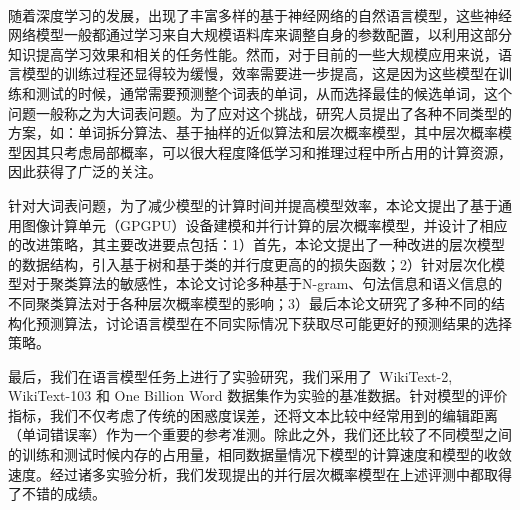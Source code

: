 \documentclass[master,openright,oneside,color]{buaathesis}
\begin{document}


\maketitle
\pagestyle{frontmatter}
\begin{cabstract}
~\

随着深度学习的发展，出现了丰富多样的基于神经网络的自然语言模型，这些神经网络模型一般都通过学习来自大规模语料库来调整自身的参数配置，以利用这部分知识提高学习效果和相关的任务性能。然而，对于目前的一些大规模应用来说，语言模型的训练过程还显得较为缓慢，效率需要进一步提高，这是因为这些模型在训练和测试的时候，通常需要预测整个词表的单词，从而选择最佳的候选单词，这个问题一般称之为大词表问题。为了应对这个挑战，研究人员提出了各种不同类型的方案，如：单词拆分算法、基于抽样的近似算法和层次概率模型，其中层次概率模型因其只考虑局部概率，可以很大程度降低学习和推理过程中所占用的计算资源，因此获得了广泛的关注。

针对大词表问题，为了减少模型的计算时间并提高模型效率，本论文提出了基于通用图像计算单元（GPGPU）设备建模和并行计算的层次概率模型，并设计了相应的改进策略，其主要改进要点包括：1）首先，本论文提出了一种改进的层次模型的数据结构，引入基于树和基于类的并行度更高的的损失函数；2）针对层次化模型对于聚类算法的敏感性，本论文讨论多种基于N-gram、句法信息和语义信息的不同聚类算法对于各种层次概率模型的影响；3）最后本论文研究了多种不同的结构化预测算法，讨论语言模型在不同实际情况下获取尽可能更好的预测结果的选择策略。

最后，我们在语言模型任务上进行了实验研究，我们采用了~WikiText-2, WikiText-103 和 One Billion Word 数据集作为实验的基准数据。针对模型的评价指标，我们不仅考虑了传统的困惑度误差，还将文本比较中经常用到的编辑距离（单词错误率）作为一个重要的参考准测。除此之外，我们还比较了不同模型之间的训练和测试时候内存的占用量，相同数据量情况下模型的计算速度和模型的收敛速度。经过诸多实验分析，我们发现提出的并行层次概率模型在上述评测中都取得了不错的成绩。

\end{cabstract}
\end{document}
